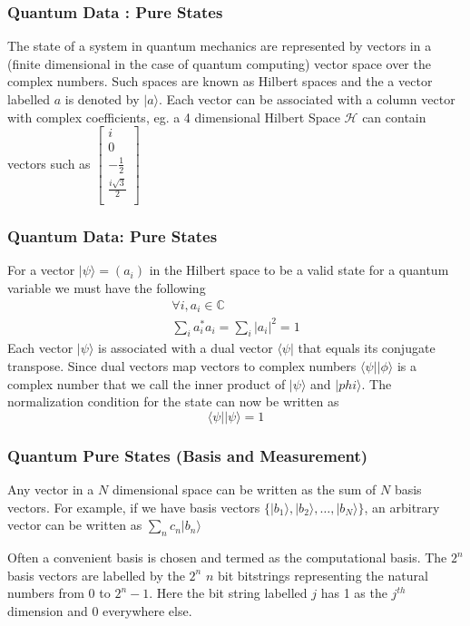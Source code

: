 \documentclass{beamer}
\newcommand{\bra}[1]{\langle #1 \vert}
\newcommand{\ket}[1]{\vert #1 \rangle}
\begin{document}
\begin{frame}
  \frametitle{Quantum Data : Pure States}
  The state of a system in quantum mechanics are represented by vectors in a (finite dimensional in the case of quantum computing) vector space over the complex numbers. Such spaces are known as Hilbert spaces and the a vector labelled $a$ is denoted by $\ket{a}$. Each vector can be associated with a column vector with complex coefficients, eg. a 4 dimensional Hilbert Space $\mathcal{H}$ can contain vectors such as
  $
  \begin{bmatrix}
    i \\
    0\\
    -\frac{1}{2}\\
    \frac{i\sqrt{3}}{2}\\
  \end{bmatrix} $
\end{frame}

\begin{frame}
  \frametitle{Quantum Data: Pure States}
For a vector $\ket{\psi} = (a_i)$ in the Hilbert space to be a valid state for a quantum variable we must have the following
\begin{align}
  \forall i, a_i \in \mathbb{C} \\
  \sum _i a_i^{\ast}a_i = \sum_i |a_i|^2 = 1
\end{align}
Each vector $\ket{\psi}$ is associated with a dual vector $\bra{\psi}$ that equals its conjugate transpose. Since dual vectors map vectors to complex numbers $\bra{\psi}\ket{\phi}$ is a complex number that we call the inner product of $\ket{\psi}$ and $\ket{phi}$. The normalization condition for the state can now be written as
\[
  \bra{\psi}\ket{\psi} = 1
\]
\end{frame}

\begin{frame}
  \frametitle{Quantum Pure States (Basis and Measurement)}
  Any vector in a $N$ dimensional space can be written as the sum of $N$ basis vectors. For example, if we have basis vectors $\{\ket{b_1},\ket{b_2},\dots,\ket{b_N}\}$, an arbitrary vector can be written as
  $
  \sum\limits_n c_n\ket{b_n}
  $

  Often a convenient basis is chosen and termed as the computational basis. The $2^n$ basis vectors are labelled by the $2^n$ $n$ bit bitstrings representing the natural numbers from $0$ to $2^n-1$. Here the bit string labelled $j$ has 1 as the $j^{th}$ dimension and 0 everywhere else.
\end{frame}
\end{document}
